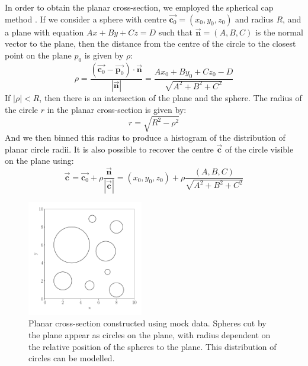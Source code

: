 \documentclass[journal]{IEEEtran}
\begin{document}
In order to obtain the planar cross-section, we employed the spherical cap
method . If we consider a sphere with centre
$\overrightarrow{\textbf{c}_0} = (x_0, y_0, z_0)$ and radius $R$, and a plane
with equation $Ax + By + Cz = D$ such that $\overrightarrow{\textbf{n}} = (A, B,
C)$ is the normal vector to the plane, then the distance from the centre of the
circle to the closest point on the plane $p_0$ is given by $\rho$:
\begin{equation*}
\rho = \frac{(\overrightarrow{\textbf{c}_0} - \overrightarrow{\textbf{p}_0}) \cdot{}
  \overrightarrow{\textbf{n}}}{|\overrightarrow{\textbf{n}}|} = \frac{Ax_0 +
  By_0 + Cz_0 - D}{\sqrt{A^2 + B^2 + C^2}}
\end{equation*}
If $|\rho| < R$, then there is an intersection of the plane and the sphere. The
radius of the circle $r$ in the planar cross-section is given by:
\begin{equation*}
r = \sqrt{R^2 - \rho^2}
\end{equation*}
And we then binned this radius to produce a histogram of the distribution of
planar circle radii. It is also possible to recover the centre
$\overrightarrow{\textbf{c}}$ of the circle visible on the plane using:
\begin{equation*}
\overrightarrow{\textbf{c}} = \overrightarrow{\textbf{c}_0} +
\rho\frac{\overrightarrow{\textbf{n}}}{|\overrightarrow{\textbf{c}}|} = (x_0,
y_0, z_0) + \rho\frac{(A, B, C)}{\sqrt{A^2 + B^2 + C^2}}
\end{equation*}

\begin{figure}%
\begin{center}
\includegraphics[width=0.45\textwidth]{./../Figures/circles.pdf}
\caption{Planar cross-section constructed using mock data. Spheres cut by the
  plane appear as circles on the plane, with radius dependent on the relative
  position of the spheres to the plane. This distribution of circles can be
  modelled.}\label{fig:circles}
\end{center}
\end{figure}
\end{document}
